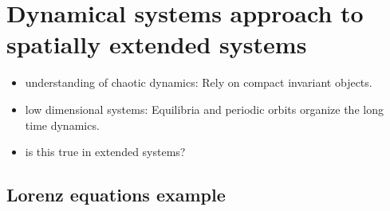 \documentclass{beamer}
\begin{document}
\section[Dynamicist's view of turbulence]
{Dynamical systems approach to spatially extended systems}

\begin{frame}{}
 \begin{itemize}
  \item understanding of chaotic dynamics: Rely on compact invariant objects.
  \item low dimensional systems: Equilibria and periodic
  orbits organize the long time dynamics.
  \item is this true in extended systems?
 \end{itemize}

\end{frame}


\subsection{Lorenz equations example}
\end{document}
